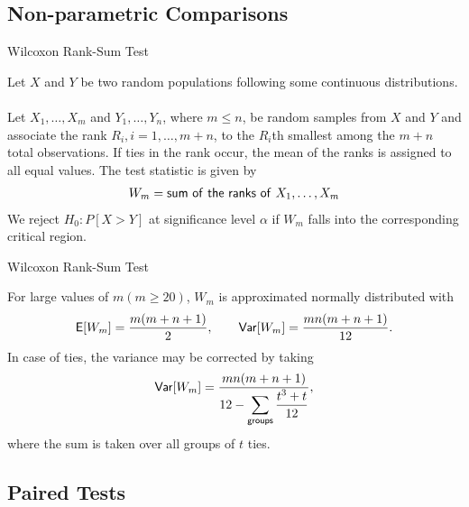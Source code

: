 \subsection{Non-parametric Comparisons}


\begin{frame}{Wilcoxon Rank-Sum Test}

\justifying
{} Let $X$ and $Y$ be two random populations following some continuous distributions. \\
~\\
Let $X_1, \ldots, X_m$ and $Y_1, \ldots, Y_n$, where $m\leq n$, be random samples from $X$ and $Y$ and associate the rank $R_i, i = 1,\ldots, m+n$, to the $R_i$th smallest among the $m+n$ total observations. If ties in the rank occur, the mean of the ranks is assigned to all equal values. The test statistic is given by
\begin{align*}
W_m = \mathsf{sum\ of\ the\ ranks\ of\ } X_1, \ldots, X_m
\end{align*}
We reject $H_0: P[X > Y]$ at significance level $\alpha$ if $W_m$ falls into the corresponding critical region. 


\end{frame}


\begin{frame}{Wilcoxon Rank-Sum Test}

\justifying
{} For large values of $m (m\geq 20)$, $W_m$ is approximated normally distributed with
\begin{align*}
\mathsf{E}[W_m] = \frac{m(m+n+1)}{2}, \qquad \mathsf{Var}[W_m] = \frac{mn(m+n+1)}{12}.
\end{align*}
In case of ties, the variance may be corrected by taking
\begin{align*}
\mathsf{Var}[W_m] = \frac{mn(m+n+1)}{12-\displaystyle \sum_{\mathsf{groups}} \frac{t^3+t}{12}},
\end{align*}
where the sum is taken over all groups of $t$ ties.


\end{frame}



\subsection{Paired Tests}



